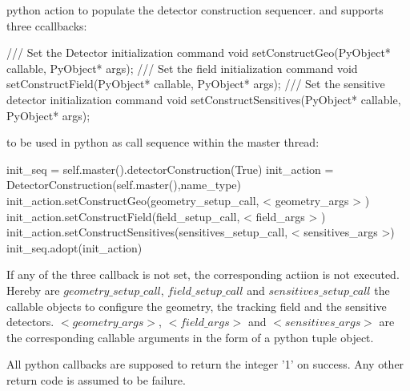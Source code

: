 \begin{itemize}
    python action to populate the detector construction sequencer.
    and supports three ccallbacks:
    \begin{code}
      /// Set the Detector initialization command
      void setConstructGeo(PyObject* callable, PyObject* args);
      /// Set the field initialization command
      void setConstructField(PyObject* callable, PyObject* args);
      /// Set the sensitive detector initialization command
      void setConstructSensitives(PyObject* callable, PyObject* args);    \end{code}
    to be used in python as call sequence within the master thread:
    \begin{code}
    init_seq = self.master().detectorConstruction(True)
    init_action = DetectorConstruction(self.master(),name_type)
    init_action.setConstructGeo(geometry_setup_call, < geometry_args > )
    init_action.setConstructField(field_setup_call, < field_args > )
    init_action.setConstructSensitives(sensitives_setup_call, < sensitives_args >)
    init_seq.adopt(init_action)                                           \end{code}
    If any of the three callback is not set, the corresponding actiion is not executed.
    Hereby are $geometry\_setup\_call$, $field\_setup\_call$ and $sensitives\_setup\_call$ 
    the callable objects to configure the geometry, the tracking field 
    and the sensitive detectors.
    $< geometry\_args >$, $< field\_args >$ and $< sensitives\_args >$ are 
    the corresponding callable arguments in the form of a python tuple object.   
\end{itemize}

\noindent
All python callbacks are supposed to return the integer '1' on success.
Any other return code is assumed to be failure.

